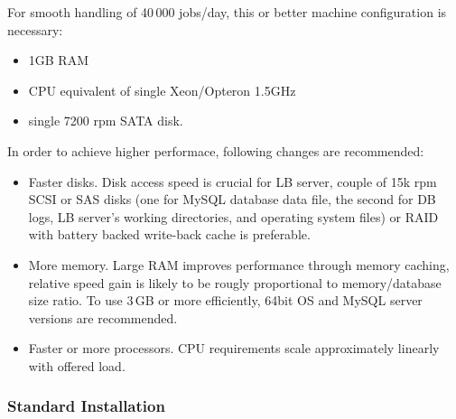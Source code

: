 For smooth handling of 40\,000 jobs/day, this or better machine configuration 
is necessary:
\begin{itemize}
\item 1GB RAM
\item CPU equivalent of single Xeon/Opteron 1.5GHz
\item single 7200 rpm SATA disk.
\end{itemize}
In order to achieve higher performace, following changes are recommended:
\begin{itemize}
\item Faster disks. Disk access speed is crucial for LB server, couple of 15k rpm
SCSI or SAS disks (one for MySQL database data file, the second for DB logs, LB server's
working directories, and operating system files) or RAID with battery backed 
write-back cache is preferable.
\item More memory. Large RAM improves performance through memory caching,
relative speed gain is likely to be rougly proportional to memory/database size ratio.
To use 3\,GB or more efficiently, 64bit OS and MySQL server versions are recommended.
\item Faster or more processors. CPU requirements scale approximately linearly with
offered load.
\end{itemize}

\subsubsection{Standard Installation}

